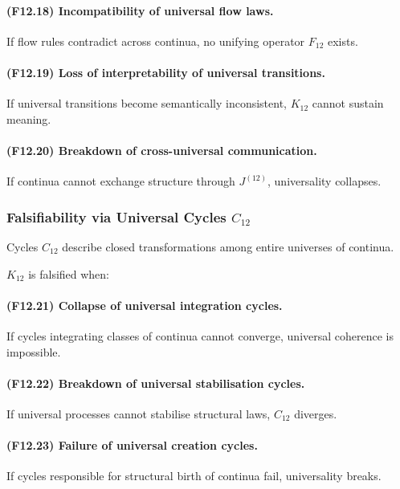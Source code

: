 \paragraph{(F12.18) Incompatibility of universal flow laws.}
If flow rules contradict across continua,
no unifying operator $F_{12}$ exists.

\paragraph{(F12.19) Loss of interpretability of universal transitions.}
If universal transitions become semantically inconsistent,
$K_{12}$ cannot sustain meaning.

\paragraph{(F12.20) Breakdown of cross-universal communication.}
If continua cannot exchange structure through $J^{(12)}$,
universality collapses.



\subsubsection{Falsifiability via Universal Cycles $C_{12}$}

Cycles $C_{12}$ describe closed transformations among entire universes
of continua.

$K_{12}$ is falsified when:

\paragraph{(F12.21) Collapse of universal integration cycles.}
If cycles integrating classes of continua cannot converge,
universal coherence is impossible.

\paragraph{(F12.22) Breakdown of universal stabilisation cycles.}
If universal processes cannot stabilise structural laws,
$C_{12}$ diverges.

\paragraph{(F12.23) Failure of universal creation cycles.}
If cycles responsible for structural birth of continua fail,
universality breaks.

